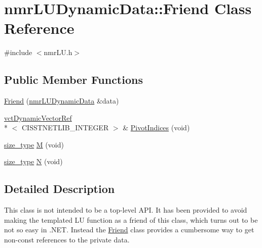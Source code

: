 \hypertarget{classnmr_l_u_dynamic_data_1_1_friend}{\section{nmr\-L\-U\-Dynamic\-Data\-:\-:Friend Class Reference}
\label{classnmr_l_u_dynamic_data_1_1_friend}
}


{\ttfamily \#include $<$nmr\-L\-U.\-h$>$}

\subsection*{Public Member Functions}
\begin{DoxyCompactItemize}
\item 
\hyperlink{classnmr_l_u_dynamic_data_1_1_friend_ac2e480c9a8c8007496de21fe039426d2}{Friend} (\hyperlink{classnmr_l_u_dynamic_data}{nmr\-L\-U\-Dynamic\-Data} \&data)
\item 
\hyperlink{classvct_dynamic_vector_ref}{vct\-Dynamic\-Vector\-Ref}\\*
$<$ C\-I\-S\-S\-T\-N\-E\-T\-L\-I\-B\-\_\-\-I\-N\-T\-E\-G\-E\-R $>$ \& \hyperlink{classnmr_l_u_dynamic_data_1_1_friend_a32c07f7c4a91c5f4b14cff1b5134fd92}{Pivot\-Indices} (void)
\item 
\hyperlink{classnmr_l_u_dynamic_data_a63259a289f8f94498b5102ce39722bbe}{size\-\_\-type} \hyperlink{classnmr_l_u_dynamic_data_1_1_friend_af33637d913857ffaf59915cc8c05218f}{M} (void)
\item 
\hyperlink{classnmr_l_u_dynamic_data_a63259a289f8f94498b5102ce39722bbe}{size\-\_\-type} \hyperlink{classnmr_l_u_dynamic_data_1_1_friend_a69f619fed2f2c03d60b2e4ffa008859a}{N} (void)
\end{DoxyCompactItemize}


\subsection{Detailed Description}
This class is not intended to be a top-\/level A\-P\-I. It has been provided to avoid making the templated L\-U function as a friend of this class, which turns out to be not so easy in .N\-E\-T. Instead the \hyperlink{classnmr_l_u_dynamic_data_1_1_friend}{Friend} class provides a cumbersome way to get non-\/const references to the private data. 

